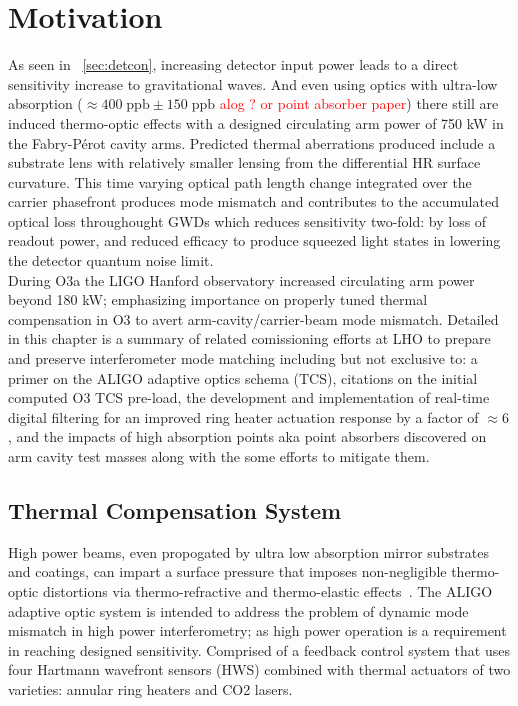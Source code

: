 



\section{Motivation}
As seen in ~\autoref{sec:detcon}, increasing detector input power leads to a direct sensitivity increase to gravitational waves. And even using optics with ultra-low absorption ($\approx 400 \; \mathrm{ppb} \pm 150 \; \mathrm{ppb}$ \textcolor{red}{alog ? or point absorber paper}) there still are induced thermo-optic effects with a designed circulating arm power of 750 kW in the Fabry-P\'{e}rot cavity arms. Predicted thermal aberrations produced include a substrate lens with relatively smaller lensing from the differential HR surface curvature. This time varying optical path length change integrated over the carrier phasefront produces mode mismatch and contributes to the accumulated optical loss throughought GWDs which reduces sensitivity two-fold: by loss of readout power, and reduced efficacy to produce squeezed light states in lowering the detector quantum noise limit.
\\
During O3a the LIGO Hanford observatory increased circulating arm power beyond 180 kW; emphasizing importance on properly tuned thermal compensation in O3 to avert arm-cavity/carrier-beam mode mismatch. Detailed in this chapter is a summary of related comissioning efforts at LHO to prepare and preserve interferometer mode matching including but not exclusive to: a primer on the ALIGO adaptive optics schema (TCS), citations on the initial computed O3 TCS pre-load, the development and implementation of real-time digital filtering for an improved ring heater actuation response by a factor of $\approx 6$, and the impacts of high absorption points aka point absorbers discovered on arm cavity test masses along with the some efforts to mitigate them.

\subsection{Thermal Compensation System}
High power beams, even propogated by ultra low absorption mirror substrates and coatings, can impart a surface pressure that imposes non-negligible thermo-optic distortions via thermo-refractive and thermo-elastic effects~\cite{hellovinet:1990}. The ALIGO adaptive optic system is intended to address the problem of dynamic mode mismatch in high power interferometry; as high power operation is a requirement in reaching designed sensitivity. Comprised of a feedback control system that uses four Hartmann wavefront sensors (HWS) combined with thermal actuators of two varieties: annular ring heaters and CO2 lasers. 

